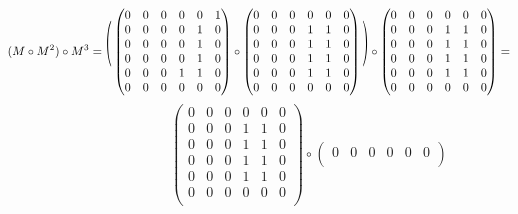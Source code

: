 \documentclass[12pt]{article}
\begin{document}
\begin{enumerate}
		    \begin{equation*}
				(M \circ M^2) \circ M^3 =
				\resizebox{0.2cm}{1cm}{$($}
				\begin{pmatrix} 
					0 & 0 & 0 & 0 & 0 & 1\\ 
					0 & 0 & 0 & 0 & 1 & 0\\
					0 & 0 & 0 & 0 & 1 & 0\\
					0 & 0 & 0 & 0 & 1 & 0\\
					0 & 0 & 0 & 1 & 1 & 0\\
					0 & 0 & 0 & 0 & 0 & 0\\
				\end{pmatrix} \circ
				\begin{pmatrix} 
					0 & 0 & 0 & 0 & 0 & 0\\ 
					0 & 0 & 0 & 1 & 1 & 0\\
					0 & 0 & 0 & 1 & 1 & 0\\
					0 & 0 & 0 & 1 & 1 & 0\\
					0 & 0 & 0 & 1 & 1 & 0\\
					0 & 0 & 0 & 0 & 0 & 0\\
				\end{pmatrix}
				\resizebox{0.2cm}{1cm}{$)$} \circ
				\begin{pmatrix} 
					0 & 0 & 0 & 0 & 0 & 0\\ 
					0 & 0 & 0 & 1 & 1 & 0\\
					0 & 0 & 0 & 1 & 1 & 0\\
					0 & 0 & 0 & 1 & 1 & 0\\
					0 & 0 & 0 & 1 & 1 & 0\\
					0 & 0 & 0 & 0 & 0 & 0\\
				\end{pmatrix} = 
			\end{equation*}
			\begin{equation*}
			\hspace{3cm}	\begin{pmatrix} 
					0 & 0 & 0 & 0 & 0 & 0\\ 
					0 & 0 & 0 & 1 & 1 & 0\\
					0 & 0 & 0 & 1 & 1 & 0\\
					0 & 0 & 0 & 1 & 1 & 0\\
					0 & 0 & 0 & 1 & 1 & 0\\
					0 & 0 & 0 & 0 & 0 & 0\\
				\end{pmatrix} \circ
				\begin{pmatrix} 
					0 & 0 & 0 & 0 & 0 & 0\\ 

\end{pmatrix}
\end{equation*}
\end{enumerate}
\end{document}

